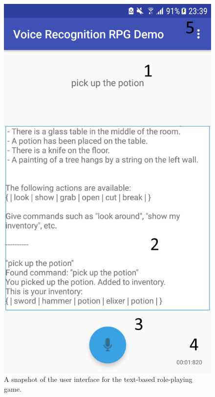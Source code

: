 \documentclass[11pt]{article}
\begin{document}
\begin{center}
\begin{figure}
\begin{center}
  \includegraphics[scale=0.4]{Screenshot_20180519-233930.png}
  \caption{A snapshot of the user interface for the text-based role-playing game.}
  \label{fig:snapshot-ui}
  \end{center}
\end{figure}
\end{center}
\end{document}
